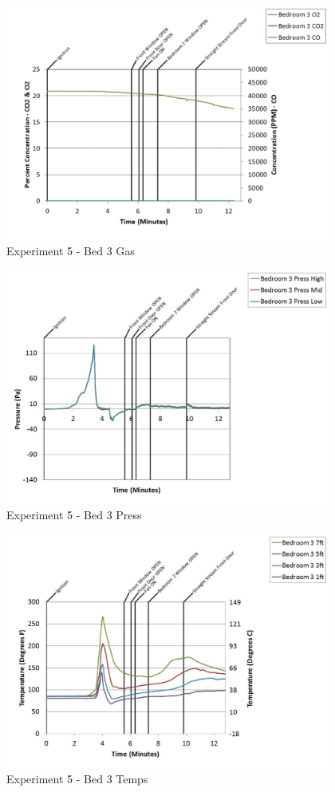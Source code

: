 \documentclass{article}
\begin{document}
\begin{appendices}
	\clearpage

	\begin{figure}[h!]
		\centering
		\includegraphics[height=3.05in]{0_Images/Results_Charts/Exp_5_Charts/Bed3Gas.pdf}
		\caption{Experiment 5 - Bed 3 Gas}
	\end{figure}
 

	\begin{figure}[h!]
		\centering
		\includegraphics[height=3.05in]{0_Images/Results_Charts/Exp_5_Charts/Bed3Press.pdf}
		\caption{Experiment 5 - Bed 3 Press}
	\end{figure}
 
	\clearpage

	\begin{figure}[h!]
		\centering
		\includegraphics[height=3.05in]{0_Images/Results_Charts/Exp_5_Charts/Bed3Temps.pdf}
		\caption{Experiment 5 - Bed 3 Temps}
	\end{figure}
 


\end{appendices}
\end{document}
